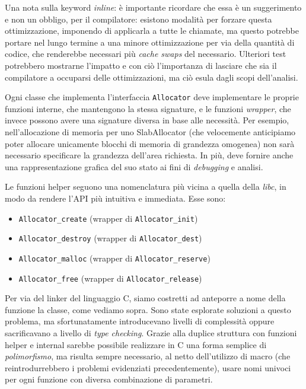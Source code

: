Una nota sulla keyword \textit{inline}: è importante ricordare che essa è un suggerimento e non un obbligo, per il compilatore: esistono modalità per forzare questa ottimizzazione, imponendo di applicarla a tutte le chiamate, ma questo potrebbe portare nel lungo termine a una minore ottimizzazione per via della quantità di codice, che renderebbe necessari più \textit{cache swaps} del necessario. Ulteriori test potrebbero mostrarne l’impatto e con ciò l’importanza di lasciare che sia il compilatore a occuparsi delle ottimizzazioni, ma ciò esula dagli scopi dell’analisi.

Ogni classe che implementa l’interfaccia \texttt{Allocator} deve implementare le proprie funzioni interne, che mantengono la stessa signature, e le funzioni \textit{wrapper}, che invece possono avere una signature diversa in base alle necessità. Per esempio, nell’allocazione di memoria per uno SlabAllocator (che velocemente anticipiamo poter allocare unicamente blocchi di memoria di grandezza omogenea) non sarà necessario specificare la grandezza dell’area richiesta. In più, deve fornire anche una rappresentazione grafica del suo stato ai fini di \textit{debugging} e analisi.

Le funzioni helper seguono una nomenclatura più vicina a quella della \textit{libc}, in modo da rendere l’API più intuitiva e immediata. Esse sono:
\begin{itemize}
    \item \texttt{Allocator\_create} (wrapper di \texttt{Allocator\_init})
    \item \texttt{Allocator\_destroy} (wrapper di \texttt{Allocator\_dest})
    \item \texttt{Allocator\_malloc} (wrapper di \texttt{Allocator\_reserve})
    \item \texttt{Allocator\_free} (wrapper di \texttt{Allocator\_release})
\end{itemize}
Per via del linker del linguaggio C, siamo costretti ad anteporre a nome della funzione la classe, come vediamo sopra. Sono state esplorate soluzioni a questo problema, ma sfortunatamente introducevano livelli di complessità oppure sacrificavano a livello di \textit{type checking}. Grazie alla duplice struttura con funzioni helper e internal sarebbe possibile realizzare in C una forma semplice di \textit{polimorfismo}, ma risulta sempre necessario, al netto dell’utilizzo di macro (che reintrodurrebbero i problemi evidenziati precedentemente), usare nomi univoci per ogni funzione con diversa combinazione di parametri.

